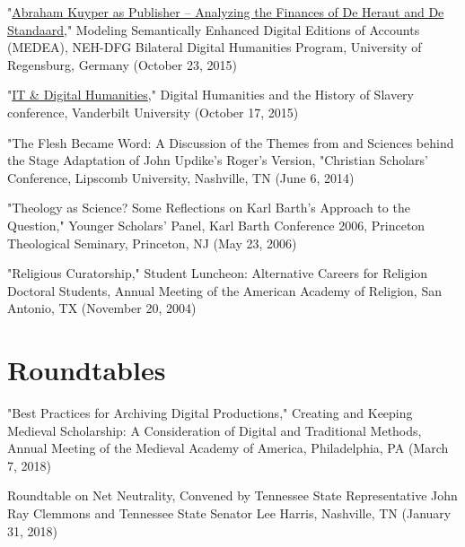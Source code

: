 \documentclass[10pt]{res} %
\begin{document}
\begin{resume}
\begin{hangparas}{.25in}{1}"\href{http://medea.hypotheses.org/200}{Abraham Kuyper as Publisher – Analyzing the Finances of De Heraut and De Standaard}," Modeling Semantically Enhanced Digital Editions of Accounts (MEDEA), NEH-DFG Bilateral Digital Humanities Program, University of Regensburg, Germany (October 23, 2015)\end{hangparas}

\begin{hangparas}{.25in}{1}"\href{https://my.vanderbilt.edu/digitalhumanities/files/2015/10/Digital-Humanities-and-the-History-of-Slavery-3.jpg}{IT \& Digital Humanities}," Digital Humanities and the History of Slavery conference, Vanderbilt University (October 17, 2015)\end{hangparas}

\begin{hangparas}{.25in}{1}"The Flesh Became Word: A Discussion of the Themes from and Sciences behind the Stage Adaptation of John Updike's Roger's Version, "Christian Scholars’ Conference, Lipscomb University, Nashville, TN (June 6, 2014)\end{hangparas}

\begin{hangparas}{.25in}{1}"Theology as Science? Some Reflections on Karl Barth’s Approach to the Question," Younger Scholars' Panel, Karl Barth Conference 2006, Princeton Theological Seminary, Princeton, NJ (May 23, 2006)\end{hangparas}

\begin{hangparas}{.25in}{1}"Religious Curatorship," Student Luncheon: Alternative Careers for Religion Doctoral Students, Annual Meeting of the American Academy of Religion, San Antonio, TX (November 20, 2004)\end{hangparas}

\section{Roundtables}

\begin{hangparas}{.25in}{1}"Best Practices for Archiving Digital Productions," Creating and Keeping Medieval Scholarship: A Consideration of Digital and Traditional Methods, Annual Meeting of the Medieval Academy of America, Philadelphia, PA (March 7, 2018)\end{hangparas}

\begin{hangparas}{.25in}{1}Roundtable on Net Neutrality, Convened by Tennessee State Representative John Ray Clemmons and Tennessee State Senator Lee Harris, Nashville, TN (January 31, 2018)\end{hangparas}


\end{resume}
\end{document}
